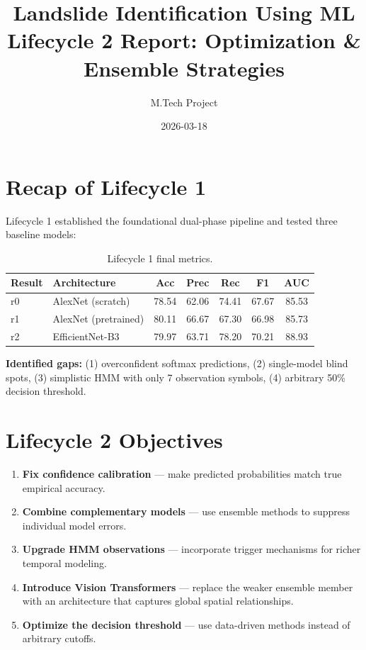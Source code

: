 \documentclass[11pt]{article}
\title{Landslide Identification Using ML \\ \large Lifecycle 2 Report: Optimization \& Ensemble Strategies}
\author{M.Tech Project}
\date{2026-03-18}
\begin{document}
\maketitle

\section{Recap of Lifecycle 1}

Lifecycle 1 established the foundational dual-phase pipeline and tested three baseline models:

\begin{table}[H]
    \centering
    \renewcommand{\arraystretch}{1.2}
    \begin{tabular}{llccccc}
        \toprule
        \textbf{Result} & \textbf{Architecture} & \textbf{Acc} & \textbf{Prec} & \textbf{Rec} & \textbf{F1} & \textbf{AUC} \\
        \midrule
        r0 & AlexNet (scratch) & 78.54 & 62.06 & 74.41 & 67.67 & 85.53 \\
        r1 & AlexNet (pretrained) & 80.11 & 66.67 & 67.30 & 66.98 & 85.73 \\
        r2 & EfficientNet-B3 & 79.97 & 63.71 & 78.20 & 70.21 & 88.93 \\
        \bottomrule
    \end{tabular}
    \caption{Lifecycle 1 final metrics.}
\end{table}

\noindent \textbf{Identified gaps:} (1) overconfident softmax predictions, (2) single-model blind spots, (3) simplistic HMM with only 7 observation symbols, (4) arbitrary 50\% decision threshold.

\section{Lifecycle 2 Objectives}

\begin{enumerate}
    \item \textbf{Fix confidence calibration} --- make predicted probabilities match true empirical accuracy.
    \item \textbf{Combine complementary models} --- use ensemble methods to suppress individual model errors.
    \item \textbf{Upgrade HMM observations} --- incorporate trigger mechanisms for richer temporal modeling.
    \item \textbf{Introduce Vision Transformers} --- replace the weaker ensemble member with an architecture that captures global spatial relationships.
    \item \textbf{Optimize the decision threshold} --- use data-driven methods instead of arbitrary cutoffs.
\end{enumerate}
\end{document}
